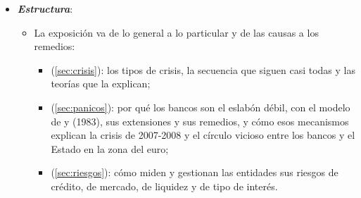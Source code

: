 \documentclass[11pt]{article}
\begin{document}
\begin{itemize}
\item \textbf{\emph{Estructura}}:
  \begin{itemize}
  \item La exposición va de lo general a lo particular y de las causas a los remedios:
    \begin{itemize}
    \item {} (\ref{sec:crisis}): los tipos de crisis, la secuencia que siguen casi todas y las teorías que la explican;
    \item {} (\ref{sec:panicos}): por qué los bancos son el eslabón débil, con el modelo de  y  (1983), sus extensiones y sus remedios, y cómo esos mecanismos explican la crisis de 2007-2008 y el círculo vicioso entre los bancos y el Estado en la zona del euro;
    \item {} (\ref{sec:riesgos}): cómo miden y gestionan las entidades sus riesgos de crédito, de mercado, de liquidez y de tipo de interés.
    \end{itemize}
  \end{itemize}
\end{itemize}
\end{document}
